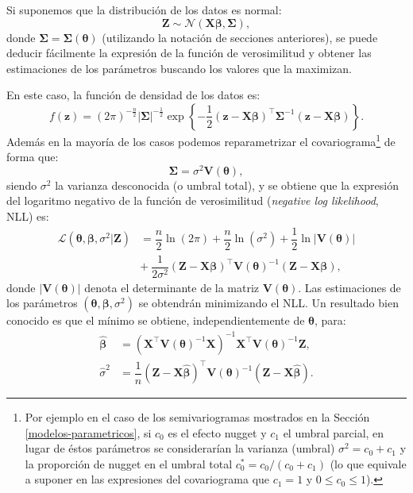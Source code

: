 \documentclass[
  spanish,
]{book}
\theoremstyle{break}
\theoremstyle{definition}
\theoremstyle{definition}
\theoremstyle{definition}
\theoremstyle{definition}
\theoremstyle{remark}
\begin{document}
Si suponemos que la distribución de los datos es normal:
\[\mathbf{Z}\sim \mathcal{N}(\mathbf{X}\boldsymbol{\beta},\boldsymbol{\Sigma}),\]
donde \(\boldsymbol{\Sigma}=\boldsymbol{\Sigma}(\boldsymbol{\theta})\) (utilizando la notación de secciones anteriores), se puede deducir fácilmente la expresión de la función de verosimilitud y obtener las estimaciones de los parámetros buscando los valores que la maximizan.

En este caso, la función de densidad de los datos es:
\[f(\mathbf{z})=(2\pi )^{-\frac{n}{2} } \left| \boldsymbol{\Sigma} \right|^{-\frac{1}{2} }
\exp \left\{ -\dfrac{1}{2}(\mathbf{z}-\mathbf{X}\boldsymbol{\beta})^\top \boldsymbol{\Sigma}^{-1}(\mathbf{z}-\mathbf{X}\boldsymbol{\beta})\right\}.\]
Además en la mayoría de los casos podemos reparametrizar el covariograma\footnote{Por ejemplo en el caso de los semivariogramas mostrados en la Sección \ref{modelos-parametricos}, si \(c_{0}\) es el efecto nugget y \(c_1\) el umbral parcial, en lugar de éstos parámetros se considerarían la varianza (umbral) \(\sigma^2 =c_{0} +c_1\) y la proporción de nugget en el umbral total \(c_{0}^{\ast} =c_{0} /(c_{0} +c_1)\) (lo que equivale a suponer en las expresiones del covariograma que \(c_1 =1\) y \(0 \leq c_{0} \leq 1\)).} de forma que:
\[\boldsymbol{\Sigma}=\sigma^2 \mathbf{V}(\boldsymbol{\theta}),\]
siendo \(\sigma^2\) la varianza desconocida (o umbral total), y se obtiene que la expresión del logaritmo negativo de la función de verosimilitud (\emph{negative log likelihood}, NLL) es:
\[\begin{aligned}
\mathcal{L}(\boldsymbol{\theta},\boldsymbol{\beta},\sigma^2 \left| \mathbf{Z} \right.) & = \dfrac{n}{2} \ln (2\pi) + \dfrac{n}{2} \ln(\sigma^2) + \dfrac{1}{2} \ln \left| \mathbf{V}(\boldsymbol{\theta}) \right|  \\
& + \ \dfrac{1}{2\sigma^2 }(\mathbf{Z}-\mathbf{X}\boldsymbol{\beta})^\top \mathbf{V}(\boldsymbol{\theta})^{-1}(\mathbf{Z}-\mathbf{X}\boldsymbol{\beta}),
\end{aligned}\]
donde \(\left| \mathbf{V}(\boldsymbol{\theta})\right|\) denota el determinante de la matriz \(\mathbf{V}(\boldsymbol{\theta})\).
Las estimaciones de los parámetros \((\boldsymbol{\theta}, \boldsymbol{\beta}, \sigma^2)\) se obtendrán minimizando el NLL.
Un resultado bien conocido es que el mínimo se obtiene, independientemente de \(\boldsymbol{\theta}\), para:
\begin{equation} 
  \begin{aligned}
  \hat{\boldsymbol{\beta}} & =(\mathbf{X}^\top\mathbf{V}(\boldsymbol{\theta})^{-1} \mathbf{X})^{-1} \mathbf{X}^\top\mathbf{V}(\boldsymbol{\theta})^{-1} \mathbf{Z}, \\
  \hat{\sigma }^2 & =\dfrac{1}{n}(\mathbf{Z}-\mathbf{X}\hat{\boldsymbol{\beta}})^\top
  \mathbf{V}(\boldsymbol{\theta})^{-1}(\mathbf{Z}-\mathbf{X}\hat{\boldsymbol{\beta}}).
  \end{aligned}
  \label{eq:estimadores-ml}
\end{equation}
\end{document}
